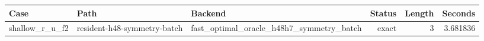 {\small
\begin{tabular}{lllrrr}
\hline
Case & Path & Backend & Status & Length & Seconds \\
\hline
shallow\_r\_u\_f2 & resident-h48-symmetry-batch & fast\_optimal\_oracle\_h48h7\_symmetry\_batch & exact & 3 & 3.681836 \\
\hline
\end{tabular}
}
